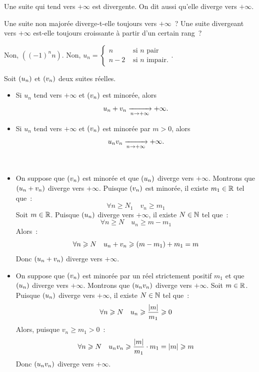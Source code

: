 \documentclass{magnolia}
\begin{document}
\begin{remarqueUnique}
\remarque Une suite qui tend vers $+\infty$ est divergente. On dit aussi
  qu'elle diverge vers $+\infty$.
\end{remarqueUnique}

\begin{exoUnique}
\exo Une suite non majorée diverge-t-elle toujours vers $+\infty$~? Une
  suite divergeant vers $+\infty$ est-elle toujours croissante à partir d'un
  certain rang~?
\end{exoUnique}

\begin{sol}
Non, $((-1)^nn)$.
Non, $u_n=\begin{cases}n &\text{ si } n \text{ pair}\\
n-2 &\text{ si } n \text{ impair}.
\end{cases}$.
\end{sol}

\begin{proposition}[utile=-3]
Soit $\left(u_n\right)$ et $\left(v_n\right)$ deux suites réelles.
\begin{itemize}
\item Si $u_n$ tend vers $+\infty$ et $\left(v_n\right)$ est minorée, alors
  \[u_n+v_n \xrightarrow[n\rightarrow +\infty]{} +\infty.\]
\item Si $u_n$ tend vers $+\infty$ et $\left(v_n\right)$ est minorée par $m>0$,
  alors
  \[u_nv_n \xrightarrow[n\rightarrow +\infty]{} +\infty.\]
\end{itemize}
\end{proposition}

\begin{preuve}
$\quad$
\begin{itemize}
\item On suppose que $\left(v_n\right)$ est minorée et que $\left(u_n\right)$ diverge vers
  $+\infty$. Montrons que $\left(u_n+v_n\right)$ diverge vers $+\infty$. Puisque
  $\left(v_n\right)$ est minorée, il existe $m_1\in\mathbb{R}$ tel que~:
  \[\forall n\geq N_1 \quad v_n \geq m_1\]
  Soit $m\in\mathbb{R}$. Puisque $\left(u_n\right)$ diverge vers $+\infty$, il existe $N\in\mathbb{N}$
  tel que~:
  \[\forall n\geq N \quad u_n \geq m-m_1\]
  Alors~:
  \[\forall n\geqslant N \quad u_n+v_n \geqslant \left(m-m_1\right)+m_1=m\]
  Donc $\left(u_n+v_n\right)$ diverge vers $+\infty$.
\item On suppose que $\left(v_n\right)$ est minorée par un réel strictement positif $m_1$
  et que $\left(u_n\right)$ diverge vers $+\infty$. Montrons que $\left(u_n v_n\right)$ diverge
  vers $+\infty$. Soit $m\in\mathbb{R}$. Puisque $\left(u_n\right)$ diverge vers $+\infty$,
  il existe $N\in\mathbb{N}$ tel que~:
  \[\forall n\geqslant N \quad u_n \geqslant \frac{\left|m\right|}{m_1} \geqslant 0\]
  Alors, puisque $v_n \geq m_1 >0$~:
  \[\forall n\geqslant N \quad u_n v_n \geqslant \frac{\left|m\right|}{m_1}\cdot m_1 =
    \left|m\right| \geqslant m\]
  Donc $\left(u_n v_n\right)$ diverge vers $+\infty$.
\end{itemize}
\end{preuve}
\end{document}
